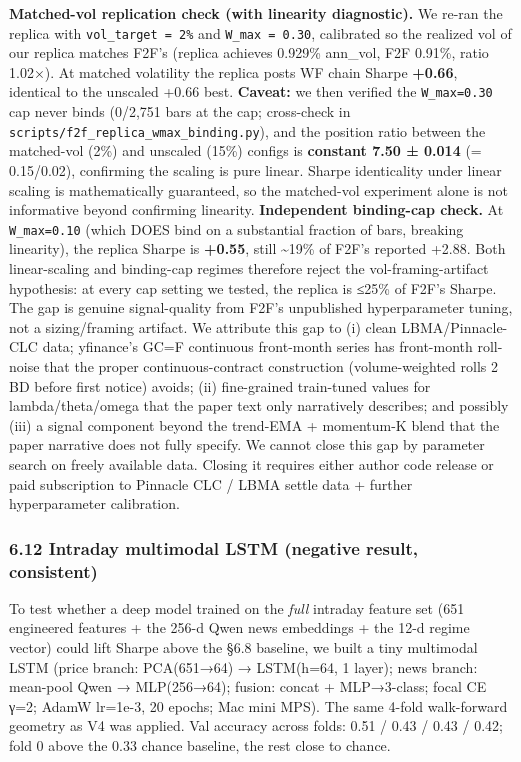 \documentclass[
]{article}
\begin{document}
\textbf{Matched-vol replication check (with linearity diagnostic).} We
re-ran the replica with \texttt{vol\_target\ =\ 2\%} and
\texttt{W\_max\ =\ 0.30}, calibrated so the realized vol of our replica
matches F2F's (replica achieves 0.929\% ann\_vol, F2F 0.91\%, ratio
1.02×). At matched volatility the replica posts WF chain Sharpe
\textbf{+0.66}, identical to the unscaled +0.66 best. \textbf{Caveat:}
we then verified the \texttt{W\_max=0.30} cap never binds (0/2,751 bars
at the cap; cross-check in
\texttt{scripts/f2f\_replica\_wmax\_binding.py}), and the position ratio
between the matched-vol (2\%) and unscaled (15\%) configs is
\textbf{constant 7.50 ± 0.014} (= 0.15/0.02), confirming the scaling is
pure linear. Sharpe identicality under linear scaling is mathematically
guaranteed, so the matched-vol experiment alone is not informative
beyond confirming linearity. \textbf{Independent binding-cap check.} At
\texttt{W\_max=0.10} (which DOES bind on a substantial fraction of bars,
breaking linearity), the replica Sharpe is \textbf{+0.55}, still
\textasciitilde19\% of F2F's reported +2.88. Both linear-scaling and
binding-cap regimes therefore reject the vol-framing-artifact
hypothesis: at every cap setting we tested, the replica is ≤25\% of
F2F's Sharpe. The gap is genuine signal-quality from F2F's unpublished
hyperparameter tuning, not a sizing/framing artifact. We attribute this
gap to (i) clean LBMA/Pinnacle-CLC data; yfinance's GC=F continuous
front-month series has front-month roll-noise that the proper
continuous-contract construction (volume-weighted rolls 2 BD before
first notice) avoids; (ii) fine-grained train-tuned values for
lambda/theta/omega that the paper text only narratively describes; and
possibly (iii) a signal component beyond the trend-EMA + momentum-K
blend that the paper narrative does not fully specify. We cannot close
this gap by parameter search on freely available data. Closing it
requires either author code release or paid subscription to Pinnacle CLC
/ LBMA settle data + further hyperparameter calibration.

\subsubsection{6.12 Intraday multimodal LSTM (negative result,
consistent)}\label{intraday-multimodal-lstm-negative-result-consistent}

To test whether a deep model trained on the \emph{full} intraday feature
set (651 engineered features + the 256-d Qwen news embeddings + the 12-d
regime vector) could lift Sharpe above the §6.8 baseline, we built a
tiny multimodal LSTM (price branch: PCA(651→64) → LSTM(h=64, 1 layer);
news branch: mean-pool Qwen → MLP(256→64); fusion: concat + MLP→3-class;
focal CE γ=2; AdamW lr=1e-3, 20 epochs; Mac mini MPS). The same 4-fold
walk-forward geometry as V4 was applied. Val accuracy across folds: 0.51
/ 0.43 / 0.43 / 0.42; fold 0 above the 0.33 chance baseline, the rest
close to chance.
\end{document}
